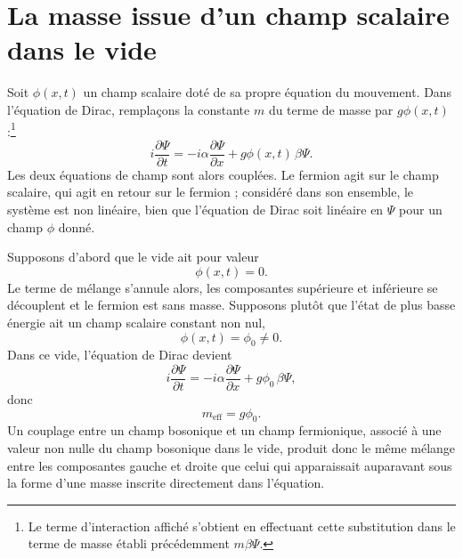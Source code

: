 \section{La masse issue d’un champ scalaire dans le vide}

\begin{classroomqa}
\end{classroomqa}

Soit \(\phi(x,t)\) un champ scalaire doté de sa propre équation du mouvement. Dans l’équation de Dirac, remplaçons la constante \(m\) du terme de masse par \(g\phi(x,t)\) :\footnote{Le terme d’interaction affiché s’obtient en effectuant cette substitution dans le terme de masse établi précédemment \(m\beta\Psi\).}\begin{equation}
i\frac{\partial\Psi}{\partial t}
=
-i\alpha\frac{\partial\Psi}{\partial x}
+g\phi(x,t)\,\beta\Psi.
\end{equation}
Les deux équations de champ sont alors couplées. Le fermion agit sur le champ scalaire, qui agit en retour sur le fermion ; considéré dans son ensemble, le système est non linéaire, bien que l’équation de Dirac soit linéaire en \(\Psi\) pour un champ \(\phi\) donné.

Supposons d’abord que le vide ait pour valeur
\begin{equation}
\phi(x,t)=0.
\end{equation}
Le terme de mélange s’annule alors, les composantes supérieure et inférieure se découplent et le fermion est sans masse. Supposons plutôt que l’état de plus basse énergie ait un champ scalaire constant non nul,
\begin{equation}
\phi(x,t)=\phi_0\neq0.
\end{equation}
Dans ce vide, l’équation de Dirac devient
\begin{equation}
i\frac{\partial\Psi}{\partial t}
=
-i\alpha\frac{\partial\Psi}{\partial x}
+g\phi_0\,\beta\Psi,
\end{equation}
donc
\begin{equation}
m_{\mathrm{eff}}=g\phi_0.
\end{equation}
Un couplage entre un champ bosonique et un champ fermionique, associé à une valeur non nulle du champ bosonique dans le vide, produit donc le même mélange entre les composantes gauche et droite que celui qui apparaissait auparavant sous la forme d’une masse inscrite directement dans l’équation.

